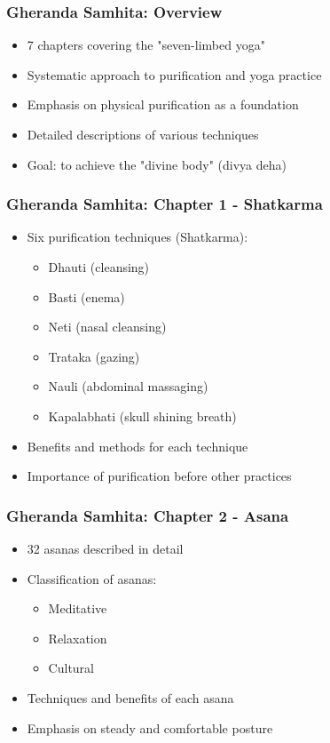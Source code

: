 
\begin{frame}[fragile]\frametitle{Gheranda Samhita: Overview}
\begin{itemize}
    \item 7 chapters covering the "seven-limbed yoga"
    \item Systematic approach to purification and yoga practice
    \item Emphasis on physical purification as a foundation
    \item Detailed descriptions of various techniques
    \item Goal: to achieve the "divine body" (divya deha)
\end{itemize}
\end{frame}

\begin{frame}[fragile]\frametitle{Gheranda Samhita: Chapter 1 - Shatkarma}
\begin{itemize}
    \item Six purification techniques (Shatkarma):
    \begin{itemize}
        \item Dhauti (cleansing)
        \item Basti (enema)
        \item Neti (nasal cleansing)
        \item Trataka (gazing)
        \item Nauli (abdominal massaging)
        \item Kapalabhati (skull shining breath)
    \end{itemize}
    \item Benefits and methods for each technique
    \item Importance of purification before other practices
\end{itemize}
\end{frame}

\begin{frame}[fragile]\frametitle{Gheranda Samhita: Chapter 2 - Asana}
\begin{itemize}
    \item 32 asanas described in detail
    \item Classification of asanas:
    \begin{itemize}
        \item Meditative
        \item Relaxation
        \item Cultural
    \end{itemize}
    \item Techniques and benefits of each asana
    \item Emphasis on steady and comfortable posture
\end{itemize}
\end{frame}

